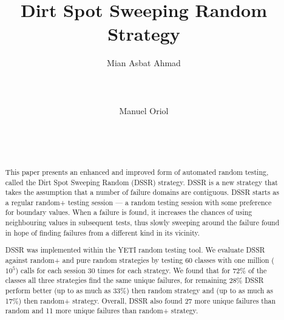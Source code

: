 \documentclass{acm_proc_article-sp}
\begin{document}
\title{Dirt Spot Sweeping Random Strategy}


%
\author{
%
%
\alignauthor
Mian Asbat Ahmad\\
       \\
       \\
       \\
\alignauthor
Manuel Oriol \\
       \\
       \\
       \\
}



\maketitle
\begin{abstract}
This paper presents an enhanced and improved form of automated random testing, called the Dirt Spot Sweeping Random (DSSR) strategy. DSSR is a new strategy that takes the assumption that a number of failure domains are contiguous.
DSSR starts as a regular random+ testing session --- a random testing session with some preference for boundary values. 
When a failure is found, it increases the chances of using neighbouring values in subsequent tests, thus slowly sweeping around the failure found in hope of finding failures from a different kind in its vicinity.

DSSR was implemented within the YETI random testing tool. We evaluate DSSR against random+ and pure random strategies by testing 60 classes with one million ($10^5$) calls for each session 30 times for each strategy.
We found that for 72\% of the classes all three strategies find the same unique failures, for remaining 28\% DSSR perform better (up to as much as 33\%) then random strategy and (up to as much as 17\%) then random+ strategy.
Overall, DSSR also found 27 more unique failures than random and 11 more unique failures than random+ strategy.
\end{abstract}
\end{document}
